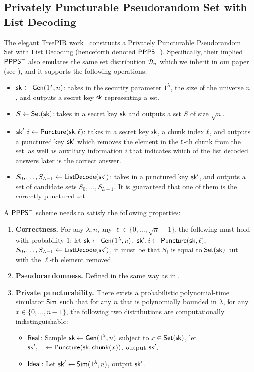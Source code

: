 \subsection{Privately Puncturable Pseudorandom Set with List Decoding}
The elegant TreePIR 
work~\cite{treepir} constructs
a Privately Puncturable Pseudorandom Set with List Decoding (henceforth
denoted ${\sf PPPS}^-$).  
Specifically, their implied ${\sf PPPS}^-$ also emulates
the same set distribution $\mathcal{D}_n$ which we inherit in our paper 
(see ), and it 
supports
the following operations:
\begin{itemize}[leftmargin=5mm]
\item
$\mathsf{sk} \leftarrow {\sf Gen}(1^\lambda, n)$:
takes in the security parameter $1^\lambda$, the size of the universe $n$,
and outputs a secret key $\mathsf{sk}$ representing a set.
\item 
$S \leftarrow {\sf Set}(\mathsf{sk})$: takes 
in a secret key $\mathsf{sk}$ and outputs a set $S$ of size $\sqrt{n}$.
\item 
$\mathsf{sk}', i \leftarrow {\sf Puncture}(\mathsf{sk}, \ell)$:
takes in a secret key $\mathsf{sk}$, a chunk index $\ell$, and 
outputs a punctured key $\mathsf{sk}'$ which 
removes 
the element in the $\ell$-th chunk from the set,
as well as auxiliary information $i$ that indicates
which of the list decoded answers later is the correct answer.
\item 
$S_0, \ldots, S_{L-1} \leftarrow {\sf ListDecode}(\mathsf{sk}')$:
takes in a punctured key $\mathsf{sk}'$, and outputs a set of candidate
sets $S_0, \ldots, S_{L-1}$. It is guaranteed that one of them is the correctly
punctured set.
\end{itemize}

A ${\sf PPPS}^-$ scheme needs to satisfy the following properties:
\begin{enumerate}[leftmargin=5mm,itemsep=1pt]
\item 
{\bf Correctness.}
For any $\lambda, n$,  
any $\ell \in \{0, \ldots, \sqrt{n}-1\}$, 
the following must hold with probability $1$:
let 
$\mathsf{sk} \leftarrow {\sf Gen}(1^\lambda, n)$, 
$\mathsf{sk}', i \leftarrow {\sf Puncture}(\mathsf{sk}, \ell)$, 
$S_0, \ldots, S_{L-1} \leftarrow {\sf ListDecode}(\mathsf{sk}')$, 
it must be that 
$S_i$ is equal to ${\sf Set}(\mathsf{sk})$ but with the $\ell$-th element removed.

\item 
{\bf Pseudorandomness.}
Defined in the same way as in .
\item 
{\bf Private puncturability.}
There exists a probabilistic polynomial-time simulator ${\sf Sim}$ such that 
for any $n$
that is polynomially bounded in $\lambda$, for any $x \in \{0, \ldots, n-1\}$, 
the following two distributions are computationally indistinguishable:
\begin{itemize}
\item  ${\sf Real}$:
Sample $\mathsf{sk} \leftarrow {\sf Gen}(1^\lambda, n)$ subject to 
$x \in {\sf Set}(\mathsf{sk})$, let $\mathsf{sk}', \_ \leftarrow  
{\sf Puncture}(\mathsf{sk}, \mathsf{chunk}(x))$, output $\mathsf{sk}'$. 
\item  ${\sf Ideal}$:
Let $\mathsf{sk}' \leftarrow {\sf Sim}(1^\lambda, n)$, output $\mathsf{sk}'$.
\end{itemize}
\end{enumerate}

